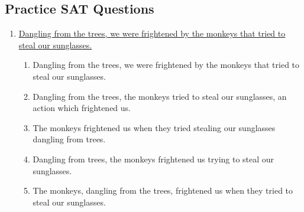 \newpage
\subsection{Practice SAT Questions}

\begin{enumerate}

\item \ul{Dangling from the trees, we were frightened by the monkeys that tried to steal our sunglasses.} 

\begin{enumerate}[label=(\Alph*)]
\item Dangling from the trees, we were frightened by the monkeys that tried to steal our sunglasses. 
\item Dangling from the trees, the monkeys tried to steal our sunglasses, an action which frightened us. 
\item The monkeys frightened us when they tried stealing our sunglasses dangling from trees. 
\item Dangling from trees, the monkeys frightened us trying to steal our sunglasses. 
\item The monkeys, dangling from the trees, frightened us when they tried to steal our sunglasses. 
\end{enumerate}

\end{enumerate}

